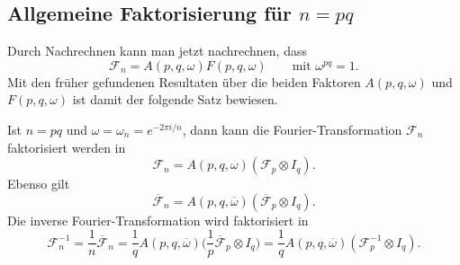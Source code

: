 %
%
%

%
%
\subsection{Allgemeine Faktorisierung für $n=pq$}
Durch Nachrechnen kann man jetzt nachrechnen, dass
\[
\mathscr{F}_n = A(p,q,\omega) F(p,q,\omega)
\qquad\text{mit $\omega^{pq}=1$}.
\]
Mit den früher gefundenen Resultaten über die beiden Faktoren
$A(p,q,\omega)$ und $F(p,q,\omega)$ ist damit der folgende
Satz bewiesen.

\begin{satz}
\label{buch:diskret:vandermonde:satz:fourierfaktorisierung}
Ist $n=pq$ und $\omega=\omega_n=e^{-2\pi i/n}$,
dann kann die Fourier-Transformation $\mathscr{F}_n$
faktorisiert werden in
\[
\mathscr{F}_n
=
A(p,q,\omega)
(
\mathscr{F}_p
\otimes
I_q
).
\]
Ebenso gilt
\[
\overline{\mathscr{F}}_n
=
A(p,q,\overline{\omega})
(
\overline{\mathscr{F}}_p
\otimes
I_q
).
\]
Die inverse Fourier-Transformation wird faktorisiert in
\[
\mathscr{F}_n^{-1}
=
\frac{1}{n}\overline{\mathscr{F}}_n
=
\frac{1}{q} A(p,q,\overline{\omega})
\biggl(
\frac1p\overline{\mathscr{F}}_p
\otimes
I_q
\biggr)
=
\frac{1}{q} A(p,q,\overline{\omega})
(\mathscr{F}_p^{-1} \otimes I_q).
\]
\end{satz}

